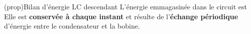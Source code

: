 \documentclass[../../main/main.tex]{subfiles}
\begin{document}
\begin{tcb*}[label=prop:lcenerg-décharge, sidebyside, righthand ratio=.3]
  (prop){Bilan d'énergie LC descendant}
  L'énergie emmagasinée dans le circuit est
  \psw{%
	\[
		\boxed{\Ec = \frac{1}{2}Cu_C{}^2 + \frac{1}{2}Li^2}
	\]
  }%
  Elle est \textbf{conservée à chaque instant} et résulte de l'\textbf{échange
    périodique} d'énergie entre le condensateur et la bobine.
  \tcblower
  \begin{center}
  \end{center}
\end{tcb*}
\end{document}
